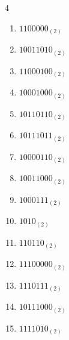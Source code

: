 \begin{multicols}{4}
\begin{enumerate}
        \phantom{$=218$}

  \item $1100000_{(2)}$

        \phantom{$=96$}

\columnbreak %

  \item $10011010_{(2)}$

        \phantom{$=154$}

  \item $11000100_{(2)}$

        \phantom{$=196$}

  \item $10001000_{(2)}$

        \phantom{$=136$}

  \item $10110110_{(2)}$

        \phantom{$=182$}

  \item $10111011_{(2)}$

        \phantom{$=187$}

  \item $10000110_{(2)}$

        \phantom{$=134$}

  \item $10011000_{(2)}$

        \phantom{$=152$}

  \item $1000111_{(2)}$

        \phantom{$=71$}

  \item $1010_{(2)}$

        \phantom{$=10$}

  \item $110110_{(2)}$

        \phantom{$=54$}

  \item $11100000_{(2)}$

        \phantom{$=224$}

  \item $1110111_{(2)}$

        \phantom{$=119$}

  \item $10111000_{(2)}$

        \phantom{$=184$}

  \item $1111010_{(2)}$


\end{enumerate}
\end{multicols}
